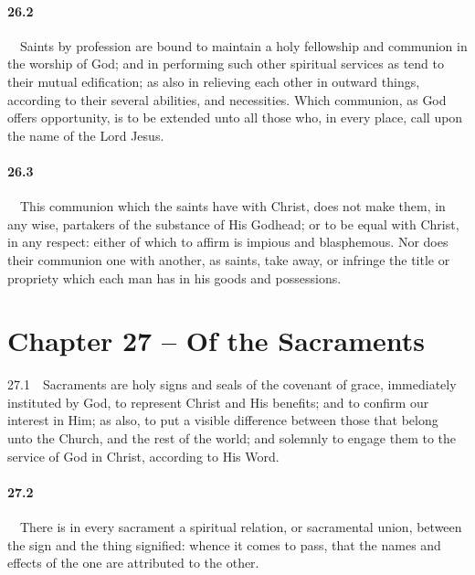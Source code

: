 \paragraph{26.2}\ \ Saints by profession are bound to maintain a holy fellowship and communion in the worship of God; and in performing such other spiritual services as tend to their mutual edification; as also in relieving each other in outward things, according to their several abilities, and necessities. Which communion, as God offers opportunity, is to be extended unto all those who, in every place, call upon the name of the Lord Jesus.   
\bigskip
\paragraph{26.3}\ \ This communion which the saints have with Christ, does not make them, in any wise, partakers of the substance of His Godhead; or to be equal with Christ, in any respect: either of which to affirm is impious and blasphemous. Nor does their communion one with another, as saints, take away, or infringe the title or propriety which each man has in his goods and possessions.  

\section{Chapter 27 -- Of the Sacraments} 27.1\ \ Sacraments are holy signs and seals of the covenant of grace, immediately instituted by God, to represent Christ and His benefits; and to confirm our interest in Him; as also, to put a visible difference between those that belong unto the Church, and the rest of the world; and solemnly to engage them to the service of God in Christ, according to His Word.   
\bigskip
\paragraph{27.2}\ \ There is in every sacrament a spiritual relation, or sacramental union, between the sign and the thing signified: whence it comes to pass, that the names and effects of the one are attributed to the other.   
\bigskip
